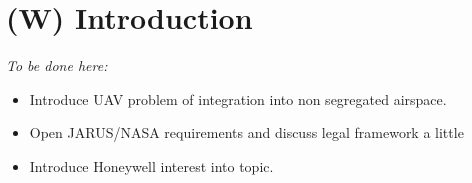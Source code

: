 \chapter{(W) Introduction}\label{ch:introduction}
    \emph{To be done here:}
    \begin{itemize}
        \item Introduce UAV problem of integration into non segregated airspace.
        \item Open JARUS/NASA requirements and discuss legal framework a little
        \item Introduce Honeywell interest into topic.
    \end{itemize}